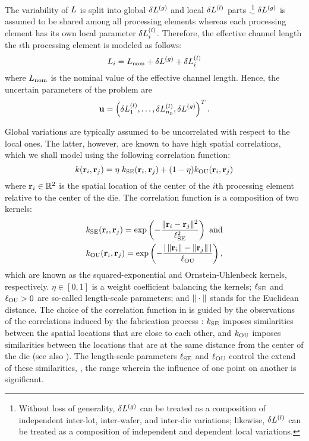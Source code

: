 
The variability of $L$ is split into global ${\delta L^{(g)}}$ and local $\delta L^{(l)}$ parts \cite{chandra2010, shen2009}.\footnote{Without loss of generality, ${\delta L^{(g)}}$ can be treated as a composition of independent inter-lot, inter-wafer, and inter-die variations; likewise, $\delta L^{(l)}$ can be treated as a composition of independent and dependent local variations.}
${\delta L^{(g)}}$ is assumed to be shared among all processing elements whereas each processing element has its own local parameter $\delta L^{(l)}_i$.
Therefore, the effective channel length the $i$th processing element is modeled as follows:
\begin{equation} \elabel{leakage-partition}
  \Leff_i = \nLeff + \gLeff + \lLeff_i
\end{equation}
where $L_\text{nom}$ is the nominal value of the effective channel length.
Hence, the uncertain parameters of the problem are
\begin{equation} \elabel{uncertain-parameters}
  \vU = \vec{\lLeff_1, \dotsc, \lLeff_\nprocs, \gLeff}.
\end{equation}

Global variations are typically assumed to be uncorrelated with respect to the local ones.
The latter, however, are known to have high spatial correlations, which we shall model using the following correlation function:
\begin{equation} \elabel{correlation-function}
  \fCorr(\vR_i, \vR_j) = \eta \; \fCorrSE(\vR_i, \vR_j) + (1 - \eta) \fCorrOU(\vR_i, \vR_j)
\end{equation}
where $\mathbf{r}_i \in \mathbb{R}^2$ is the spatial location of the center of the $i$th processing element relative to the center of the die. The correlation function is a composition of two kernels:
\begin{align*}
  & k_{\text{SE}}(\mathbf{r}_i, \mathbf{r}_j) = \exp\left(- \frac{\| \mathbf{r}_i - \mathbf{r}_j \|^2}{\ell_{\text{SE}}^2} \right) \text{ and} \\
  & k_{\text{OU}}(\mathbf{r}_i, \mathbf{r}_j) = \exp\left(- \frac{| \,\| \mathbf{r}_i \| - \| \mathbf{r}_j \|\, |}{\ell_{\text{OU}}} \right),
\end{align*}
which are known as the squared-exponential and Ornstein-Uhlenbeck kernels, respectively.
$\eta \in [0, 1]$ is a weight coefficient balancing the kernels; $\ell_{\text{SE}}$ and $\ell_{\text{OU}} > 0$ are so-called length-scale parameters; and $\| \cdot \|$ stands for the Euclidean distance.
The choice of the correlation function in  is guided by the observations of the correlations induced by the fabrication process \cite{chandrakasan2001, friedberg2005, cheng2011}: $k_{\text{SE}}$ imposes similarities between the spatial locations that are close to each other, and $k_{\text{OU}}$ imposes similarities between the locations that are at the same distance from the center of the die (see also \cite{huang2009, ghanem1991, lee2013, bhardwaj2008, ghanta2006}).
The length-scale parameters $\ell_{\text{SE}}$ and $\ell_{\text{OU}}$ control the extend of these similarities, \ie, the range wherein the influence of one point on another is significant.

